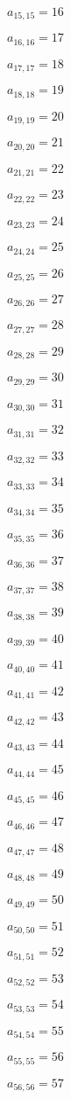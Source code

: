 \documentclass[a4paper,12pt]{article}
\begin{document}
$a _{ 15, 15 } = 16$

$a _{ 16, 16 } = 17$

$a _{ 17, 17 } = 18$

$a _{ 18, 18 } = 19$

$a _{ 19, 19 } = 20$

$a _{ 20, 20 } = 21$

$a _{ 21, 21 } = 22$

$a _{ 22, 22 } = 23$

$a _{ 23, 23 } = 24$

$a _{ 24, 24 } = 25$

$a _{ 25, 25 } = 26$

$a _{ 26, 26 } = 27$

$a _{ 27, 27 } = 28$

$a _{ 28, 28 } = 29$

$a _{ 29, 29 } = 30$

$a _{ 30, 30 } = 31$

$a _{ 31, 31 } = 32$

$a _{ 32, 32 } = 33$

$a _{ 33, 33 } = 34$

$a _{ 34, 34 } = 35$

$a _{ 35, 35 } = 36$

$a _{ 36, 36 } = 37$

$a _{ 37, 37 } = 38$

$a _{ 38, 38 } = 39$

$a _{ 39, 39 } = 40$

$a _{ 40, 40 } = 41$

$a _{ 41, 41 } = 42$

$a _{ 42, 42 } = 43$

$a _{ 43, 43 } = 44$

$a _{ 44, 44 } = 45$

$a _{ 45, 45 } = 46$

$a _{ 46, 46 } = 47$

$a _{ 47, 47 } = 48$

$a _{ 48, 48 } = 49$

$a _{ 49, 49 } = 50$

$a _{ 50, 50 } = 51$

$a _{ 51, 51 } = 52$

$a _{ 52, 52 } = 53$

$a _{ 53, 53 } = 54$

$a _{ 54, 54 } = 55$

$a _{ 55, 55 } = 56$

$a _{ 56, 56 } = 57$
\end{document}
